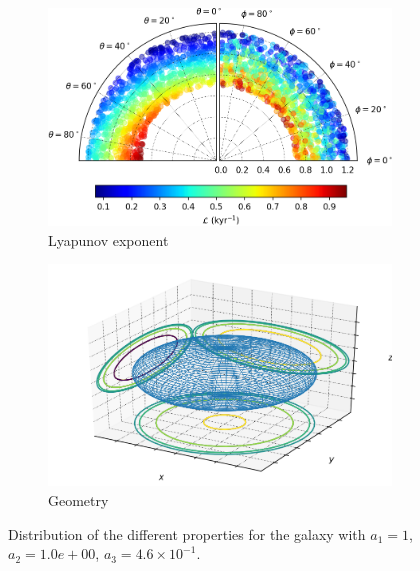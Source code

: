 \begin{figure}[h]
\begin{subfigure}[t]{0.4\textwidth}
        \includegraphics[width=\textwidth]{"../Files/Week 13/images/20_lyapunov"}
        \caption{Lyapunov exponent}
    \end{subfigure}
    \begin{subfigure}[t]{0.4\textwidth}
        \includegraphics[width=\textwidth]{"../Files/Week 13/images/20_ellipsoid"}
        \caption{Geometry}
    \end{subfigure}
    \caption{Distribution of the different properties for the galaxy with $a_1 = 1$, $a_2 = 1.0e+00$, $a_3 = 4.6\times10^{-1}$.}
\end{figure}


